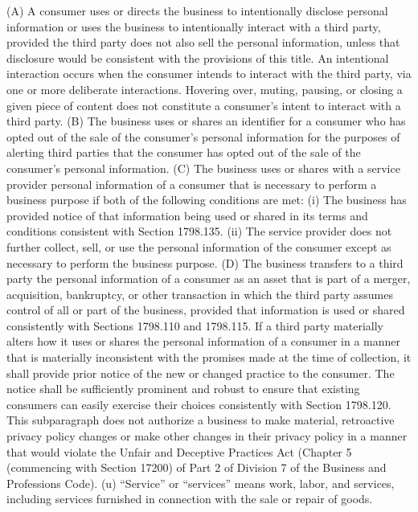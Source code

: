 (A) A consumer uses or directs the business to intentionally disclose personal information or uses the business to intentionally interact with a third party, provided the third party does not also sell the personal information, unless that disclosure would be consistent with the provisions of this title. An intentional interaction occurs when the consumer intends to interact with the third party, via one or more deliberate interactions. Hovering over, muting, pausing, or closing a given piece of content does not constitute a consumer’s intent to interact with a third party.
(B) The business uses or shares an identifier for a consumer who has opted out of the sale of the consumer’s personal information for the purposes of alerting third parties that the consumer has opted out of the sale of the consumer’s personal information.
(C) The business uses or shares with a service provider personal information of a consumer that is necessary to perform a business purpose if both of the following conditions are met:
(i) The business has provided notice of that information being used or shared in its terms and conditions consistent with Section 1798.135.
(ii) The service provider does not further collect, sell, or use the personal information of the consumer except as necessary to perform the business purpose.
(D) The business transfers to a third party the personal information of a consumer as an asset that is part of a merger, acquisition, bankruptcy, or other transaction in which the third party assumes control of all or part of the business, provided that information is used or shared consistently with Sections 1798.110 and 1798.115. If a third party materially alters how it uses or shares the personal information of a consumer in a manner that is materially inconsistent with the promises made at the time of collection, it shall provide prior notice of the new or changed practice to the consumer. The notice shall be sufficiently prominent and robust to ensure that existing consumers can easily exercise their choices consistently with Section 1798.120. This subparagraph does not authorize a business to make material, retroactive privacy policy changes or make other changes in their privacy policy in a manner that would violate the Unfair and Deceptive Practices Act (Chapter 5 (commencing with Section 17200) of Part 2 of Division 7 of the Business and Professions Code).
(u) “Service” or “services” means work, labor, and services, including services furnished in connection with the sale or repair of goods.
